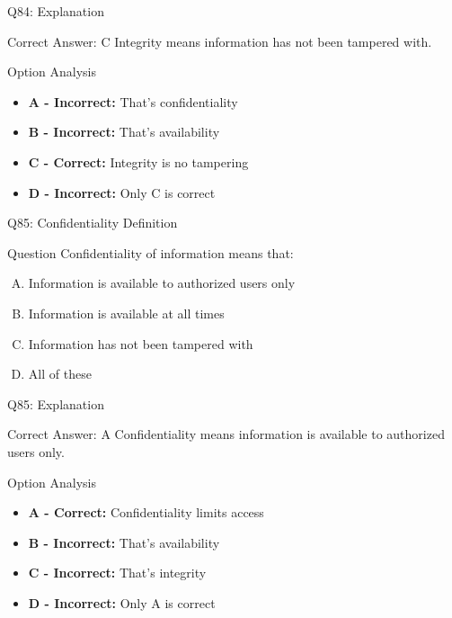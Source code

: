 \documentclass{beamer}
\begin{document}
	\begin{frame}{Q84: Explanation}
		\begin{block}{Correct Answer: C}
			Integrity means information has not been tampered with.
		\end{block}
		\begin{block}{Option Analysis}
			\begin{itemize}
				\item \textbf{A - Incorrect:} That's confidentiality
				\item \textbf{B - Incorrect:} That's availability
				\item \textbf{C - Correct:} Integrity is no tampering
				\item \textbf{D - Incorrect:} Only C is correct
			\end{itemize}
		\end{block}
	\end{frame}
	
	\begin{frame}{Q85: Confidentiality Definition}
		\begin{block}{Question}
			Confidentiality of information means that:
		\end{block}
		\begin{enumerate}[(A)]
			\item Information is available to authorized users only
			\item Information is available at all times
			\item Information has not been tampered with
			\item All of these
		\end{enumerate}
	\end{frame}
	
	\begin{frame}{Q85: Explanation}
		\begin{block}{Correct Answer: A}
			Confidentiality means information is available to authorized users only.
		\end{block}
		\begin{block}{Option Analysis}
			\begin{itemize}
				\item \textbf{A - Correct:} Confidentiality limits access
				\item \textbf{B - Incorrect:} That's availability
				\item \textbf{C - Incorrect:} That's integrity
				\item \textbf{D - Incorrect:} Only A is correct
			\end{itemize}
		\end{block}
	\end{frame}
	
\end{document}
